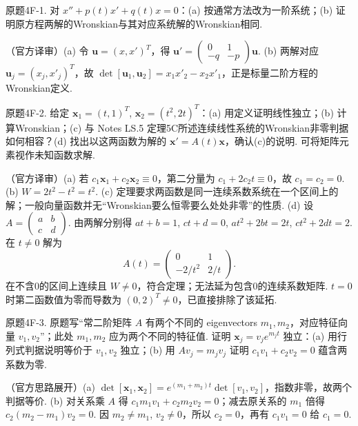 \begin{exercise}\label{cw:bank-4F-1}原题4F-1. 对 $x''+p(t)x'+q(t)x=0$：(a) 按通常方法改为一阶系统；(b) 证明原方程两解的Wronskian与其对应系统解的Wronskian相同.\end{exercise}
\begin{solution}（官方译审）(a) 令 $\mathbf u=(x,x')^T$，得 $\mathbf u'=\begin{pmatrix}0&1\\-q&-p\end{pmatrix}\mathbf u$. (b) 两解对应 $\mathbf u_j=(x_j,x'_j)^T$，故 $\det[\mathbf u_1,\mathbf u_2]=x_1x'_2-x_2x'_1$，正是标量二阶方程的Wronskian定义.\end{solution}
\begin{exercise}\label{cw:bank-4F-2}原题4F-2. 给定 $\mathbf x_1=(t,1)^T$, $\mathbf x_2=(t^2,2t)^T$：(a) 用定义证明线性独立；(b) 计算Wronskian；(c) 与 Notes LS.5 定理5C所述连续线性系统的Wronskian非零判据如何相容？(d) 找出以这两函数为解的 $\mathbf x'=A(t)\mathbf x$，确认(c)的说明. 可将矩阵元素视作未知函数求解.\end{exercise}
\begin{solution}（官方译审）(a) 若 $c_1\mathbf x_1+c_2\mathbf x_2\equiv0$，第二分量为 $c_1+2c_2t\equiv0$，故 $c_1=c_2=0$. (b) $W=2t^2-t^2=t^2$. (c) 定理要求两函数是同一连续系数系统在一个区间上的解；一般向量函数并无“Wronskian要么恒零要么处处非零”的性质. (d) 设 $A=\begin{pmatrix}a&b\\c&d\end{pmatrix}$. 由两解分别得 $at+b=1$, $ct+d=0$, $at^2+2bt=2t$, $ct^2+2dt=2$. 在 $t\ne0$ 解为
\[A(t)=\begin{pmatrix}0&1\\-2/t^2&2/t\end{pmatrix}.\]
在不含0的区间上连续且 $W\ne0$，符合定理；无法延为包含0的连续系数矩阵. $t=0$ 时第二函数值为零而导数为 $(0,2)^T\ne0$，已直接排除了该延拓.\end{solution}
\begin{exercise}\label{cw:bank-4F-3}原题4F-3. 原题写“常二阶矩阵 $A$ 有两个不同的 eigenvectors $m_1,m_2$，对应特征向量 $v_1,v_2$”；此处 $m_1,m_2$ 应为两个不同的特征值. 证明 $\mathbf x_j=v_je^{m_jt}$ 独立：(a) 用行列式判据说明等价于 $v_1,v_2$ 独立；(b) 用 $Av_j=m_jv_j$ 证明 $c_1v_1+c_2v_2=0$ 蕴含两系数为零.\end{exercise}
\begin{solution}（官方思路展开）(a) $\det[\mathbf x_1,\mathbf x_2]=e^{(m_1+m_2)t}\det[v_1,v_2]$，指数非零，故两个判据等价. (b) 对关系乘 $A$ 得 $c_1m_1v_1+c_2m_2v_2=0$；减去原关系的 $m_1$ 倍得 $c_2(m_2-m_1)v_2=0$. 因 $m_2\ne m_1$, $v_2\ne0$，所以 $c_2=0$，再有 $c_1v_1=0$ 给 $c_1=0$.\end{solution}
